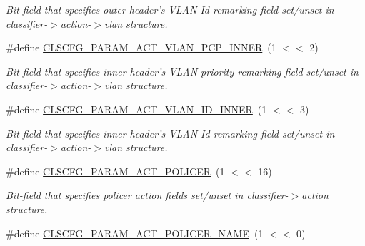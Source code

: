 \begin{DoxyCompactItemize}
\begin{DoxyCompactList}\small\item\em Bit-\/field that specifies outer header's V\-L\-A\-N Id remarking field set/unset in classifier-\/$>$action-\/$>$vlan structure. \end{DoxyCompactList}\item 
\hypertarget{group__FAPI__QOS__CLASS_gaf23dd4d1bf0d1f8a19026d91fa392a2a}{\#define \hyperlink{group__FAPI__QOS__CLASS_gaf23dd4d1bf0d1f8a19026d91fa392a2a}{C\-L\-S\-C\-F\-G\-\_\-\-P\-A\-R\-A\-M\-\_\-\-A\-C\-T\-\_\-\-V\-L\-A\-N\-\_\-\-P\-C\-P\-\_\-\-I\-N\-N\-E\-R}~(1 $<$$<$ 2)}\label{group__FAPI__QOS__CLASS_gaf23dd4d1bf0d1f8a19026d91fa392a2a}

\begin{DoxyCompactList}\small\item\em Bit-\/field that specifies inner header's V\-L\-A\-N priority remarking field set/unset in classifier-\/$>$action-\/$>$vlan structure. \end{DoxyCompactList}\item 
\hypertarget{group__FAPI__QOS__CLASS_gaf241e54eda720b4a3be21cc9ad3b1839}{\#define \hyperlink{group__FAPI__QOS__CLASS_gaf241e54eda720b4a3be21cc9ad3b1839}{C\-L\-S\-C\-F\-G\-\_\-\-P\-A\-R\-A\-M\-\_\-\-A\-C\-T\-\_\-\-V\-L\-A\-N\-\_\-\-I\-D\-\_\-\-I\-N\-N\-E\-R}~(1 $<$$<$ 3)}\label{group__FAPI__QOS__CLASS_gaf241e54eda720b4a3be21cc9ad3b1839}

\begin{DoxyCompactList}\small\item\em Bit-\/field that specifies inner header's V\-L\-A\-N Id remarking field set/unset in classifier-\/$>$action-\/$>$vlan structure. \end{DoxyCompactList}\item 
\hypertarget{group__FAPI__QOS__CLASS_gaf51cf704ebad97f348bd7c9daf9414ab}{\#define \hyperlink{group__FAPI__QOS__CLASS_gaf51cf704ebad97f348bd7c9daf9414ab}{C\-L\-S\-C\-F\-G\-\_\-\-P\-A\-R\-A\-M\-\_\-\-A\-C\-T\-\_\-\-P\-O\-L\-I\-C\-E\-R}~(1 $<$$<$ 16)}\label{group__FAPI__QOS__CLASS_gaf51cf704ebad97f348bd7c9daf9414ab}

\begin{DoxyCompactList}\small\item\em Bit-\/field that specifies policer action fields set/unset in classifier-\/$>$action structure. \end{DoxyCompactList}\item 
\hypertarget{group__FAPI__QOS__CLASS_ga946f94bb0ef9563bb4ce8f97c9f5a7d8}{\#define \hyperlink{group__FAPI__QOS__CLASS_ga946f94bb0ef9563bb4ce8f97c9f5a7d8}{C\-L\-S\-C\-F\-G\-\_\-\-P\-A\-R\-A\-M\-\_\-\-A\-C\-T\-\_\-\-P\-O\-L\-I\-C\-E\-R\-\_\-\-N\-A\-M\-E}~(1 $<$$<$ 0)}\label{group__FAPI__QOS__CLASS_ga946f94bb0ef9563bb4ce8f97c9f5a7d8}


\end{DoxyCompactItemize}
